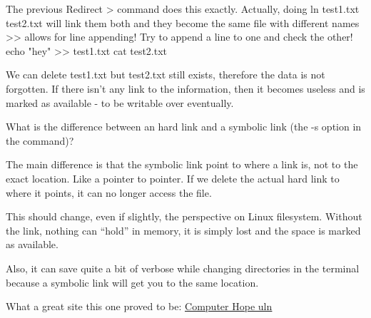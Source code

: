 The previous Redirect > command does this exactly. Actually, doing 
ln test1.txt test2.txt will link them both and they become the same file with different names
>> allows for line appending! Try to append a line to one and check the other!
echo "hey" >> test1.txt
cat test2.txt

We can delete test1.txt but test2.txt still exists, therefore the data is not forgotten. If there isn't any link to the information, then it becomes useless and is marked as available - to be writable over eventually.


What is the difference between an hard link and a symbolic link (the -s option in the command)?




The main difference is that the symbolic link point to where a link is, not to the exact location. Like a pointer to pointer. If we delete the actual hard link to where it points, it can no longer access the file.


This should change, even if slightly, the perspective on Linux filesystem. Without the link, nothing can ``hold'' in memory, it is simply lost and the space is marked as available.


Also, it can save quite a bit of verbose while changing directories in the terminal because a symbolic link will get you to the same location.


What a great site this one proved to be: \href{https://www.computerhope.com/unix/uln.htm}{\ul{Computer Hope uln}}

